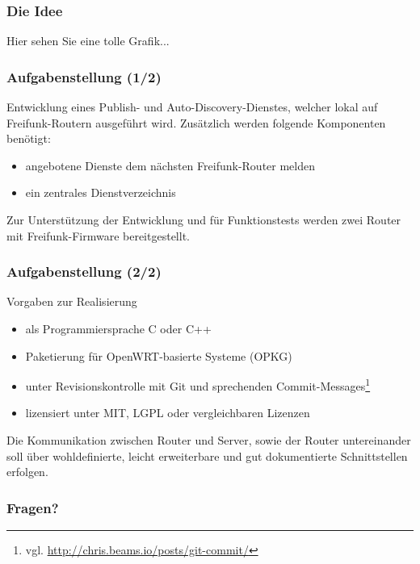 \documentclass[accentcolor=tud6b,colorbacktitle,inverttitle,landscape,german,presentation,t]{tudbeamer}
\begin{document}
	\begin{frame}
		\frametitle{Die Idee}
		\vfill
		Hier sehen Sie eine tolle Grafik...
		\vfill
	\end{frame}
	
	\begin{frame}
		\frametitle{Aufgabenstellung (1/2)}
		    Entwicklung eines Publish- und Auto-Discovery-Dienstes, welcher lokal auf Freifunk-Routern ausgeführt wird.
		    \vfill
		    \pause
		    Zusätzlich werden folgende Komponenten benötigt:
		    \begin{itemize}
		    	\item angebotene Dienste dem nächsten Freifunk-Router melden
		    	\item ein zentrales Dienstverzeichnis
		    \end{itemize}
		    \vfill
		    \pause
		    Zur Unterstützung der Entwicklung und für Funktionstests werden zwei Router mit Freifunk-Firmware bereitgestellt.
	\end{frame}
	
	\begin{frame}
		\frametitle{Aufgabenstellung (2/2)}
		\vfill
		Vorgaben zur Realisierung
		\begin{itemize}
			\item als Programmiersprache C oder C++
			\item Paketierung für OpenWRT-basierte Systeme (OPKG)
			\item unter Revisionskontrolle mit Git und sprechenden Commit-Messages\footnote{vgl. \url{http://chris.beams.io/posts/git-commit/}}
			\item lizensiert unter MIT, LGPL oder vergleichbaren Lizenzen
		\end{itemize}
		\vfill
		\pause
		Die Kommunikation zwischen Router und Server, sowie der Router untereinander soll über wohldefinierte, leicht erweiterbare und gut dokumentierte Schnittstellen erfolgen.
		\vfill
	\end{frame}
	
	\begin{frame}
		\frametitle{Fragen?}
		    \vfill
	\end{frame}
\end{document}
